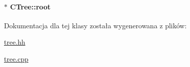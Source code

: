 \paragraph[{root}]{$\ast$ C\+Tree\+::root\hspace{0.3cm}{\ttfamily [private]}}\label{class_c_tree_a01a3595bbd583c795eed909d0d92b81b}


Dokumentacja dla tej klasy została wygenerowana z plików\+:\begin{DoxyCompactItemize}
\item 
\hyperlink{tree_8hh}{tree.\+hh}\item 
\hyperlink{tree_8cpp}{tree.\+cpp}\end{DoxyCompactItemize}
